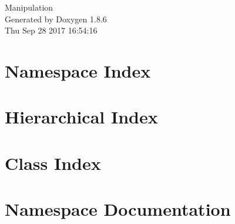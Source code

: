\documentclass[twoside]{book}
\newcommand{\clearemptydoublepage}{%
  \newpage{\pagestyle{empty}\cleardoublepage}%
}
\begin{document}
\hypersetup{pageanchor=false}
\begin{titlepage}
\vspace*{7cm}
\begin{center}%
{\Large Manipulation }\\
\vspace*{1cm}
{\large Generated by Doxygen 1.8.6}\\
\vspace*{0.5cm}
{\small Thu Sep 28 2017 16:54:16}\\
\end{center}
\end{titlepage}
\clearemptydoublepage
\tableofcontents
\clearemptydoublepage
{}
\hypersetup{pageanchor=true}

\chapter{Namespace Index}

\chapter{Hierarchical Index}

\chapter{Class Index}

\chapter{Namespace Documentation}

\end{document}
